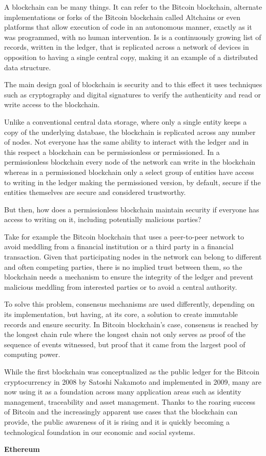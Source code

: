 \documentclass[notitlepage]{llncs}
\begin{document}
A blockchain can be many things. It can refer to the Bitcoin blockchain, alternate implementations or forks of the Bitcoin blockchain called Altchains or even platforms that allow execution of code in an autonomous manner, exactly as it was programmed, with no human intervention. Is is a continuously growing list of records, written in the ledger, that is replicated across a network of devices in opposition to having a single central copy, making it an example of a distributed data structure.
\cite{Wood2017}
\par  
The main design goal of blockchain is security and to this effect it uses techniques such as cryptography and digital signatures to verify the authenticity and read or write access to the blockchain.
\par
Unlike a conventional central data storage, where only a single entity keeps a copy of the underlying database, the blockchain is replicated across any number of nodes. Not everyone has the same ability to interact with the ledger and in this respect a blockchain can be permissionless or permissioned. In a permissionless blockchain every node of the network can write in the blockchain whereas in a permissioned blockchain only a select group of entities have access to writing in the ledger making the permissioned version, by default, secure if the entities themselves are secure and considered trustworthy.
\par
But then, how does a permissionless blockchain maintain security if everyone has access to writing on it, including potentially malicious parties?
\par
Take for example the Bitcoin blockchain that uses a peer-to-peer network to avoid meddling from a financial institution or a third party in a financial transaction. Given that participating nodes in the network can belong to different and often competing parties, there is no implied trust between them, so the blockchain needs a mechanism to ensure the integrity of the ledger and prevent malicious meddling from interested parties or to avoid a central authority.\cite{Barclay2017}
\par
To solve this problem, consensus mechanisms are used differently, depending on its implementation, but having, at its core, a solution to create immutable records and ensure security. In Bitcoin blockchain’s case, consensus is reached by the longest chain rule where the longest chain not only serves as proof of the sequence of events witnessed, but proof that it came from the largest pool of computing power.\cite{Baars2016}
\par
While the first blockchain was conceptualized as the public ledger for the Bitcoin cryptocurrency in 2008 by Satoshi Nakamoto and implemented in 2009, many are now using it as a foundation across many application areas such as identity management, traceability and asset management. Thanks to the roaring success of Bitcoin and the increasingly apparent use cases that the blockchain can provide, the public awareness of it is rising and it is quickly becoming a technological foundation in our economic and social systems.
\par
\vspace{10pt}
\textbf{Ethereum}
\vspace{6pt}
\end{document}
